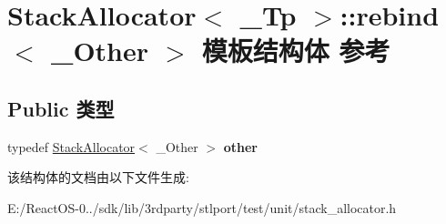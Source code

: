 \hypertarget{struct_stack_allocator_1_1rebind}{}\section{Stack\+Allocator$<$ \+\_\+\+Tp $>$\+:\+:rebind$<$ \+\_\+\+Other $>$ 模板结构体 参考}
\label{struct_stack_allocator_1_1rebind}
\subsection*{Public 类型}
\begin{DoxyCompactItemize}
\item 
\mbox{\label{struct_stack_allocator_1_1rebind_af47406d614e09395f1076ce917b0de50}} 
typedef \hyperlink{struct_stack_allocator}{Stack\+Allocator}$<$ \+\_\+\+Other $>$ {\bfseries other}
\end{DoxyCompactItemize}


该结构体的文档由以下文件生成\+:\begin{DoxyCompactItemize}
\item 
E\+:/\+React\+O\+S-\/0../sdk/lib/3rdparty/stlport/test/unit/stack\+\_\+allocator.\+h\end{DoxyCompactItemize}
